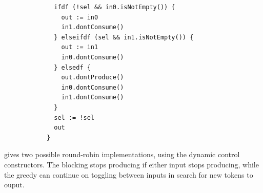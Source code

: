 \begin{itemize}
\begin{figure}[H]
\begin{minipage}{0.49\linewidth}
\begin{verbatim}
        ifdf (!sel && in0.isNotEmpty()) {
          out := in0
          in1.dontConsume()
        } elseifdf (sel && in1.isNotEmpty()) {
          out := in1
          in0.dontConsume()
        } elsedf {
          out.dontProduce()
          in0.dontConsume()
          in1.dontConsume()
        }
        sel := !sel
        out
      }
      \end{verbatim}
      \label{fig:GreedyRR}
    \end{minipage}
    \label{fig:RRMerge}
  \end{figure}
\end{itemize}

 gives two possible round-robin  implementations, using the dynamic control constructors. The blocking  stops producing if either input stops producing, while the greedy  can continue on toggling between inputs in search for new tokens to ouput.


